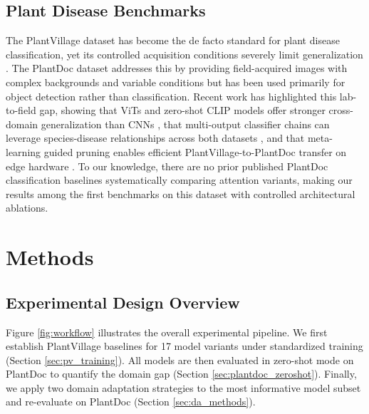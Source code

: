 \documentclass[preprint,12pt]{elsarticle}
\begin{document}
\subsection{Plant Disease Benchmarks}

The PlantVillage dataset has become the de facto standard for plant disease classification, yet its controlled acquisition conditions severely limit generalization \cite{Pandian2022}. The PlantDoc dataset \cite{Singh2020} addresses this by providing field-acquired images with complex backgrounds and variable conditions but has been used primarily for object detection rather than classification. Recent work has highlighted this lab-to-field gap, showing that ViTs and zero-shot CLIP models offer stronger cross-domain generalization than CNNs \cite{Benabbas2025}, that multi-output classifier chains can leverage species-disease relationships across both datasets \cite{Yao2025}, and that meta-learning guided pruning enables efficient PlantVillage-to-PlantDoc transfer on edge hardware \cite{Uddin2026}. To our knowledge, there are no prior published PlantDoc classification baselines systematically comparing attention variants, making our results among the first benchmarks on this dataset with controlled architectural ablations.

\section{Methods}
\label{sec:methods}

\subsection{Experimental Design Overview}

Figure \ref{fig:workflow} illustrates the overall experimental pipeline. We first establish PlantVillage baselines for 17 model variants under standardized training (Section \ref{sec:pv_training}). All models are then evaluated in zero-shot mode on PlantDoc to quantify the domain gap (Section \ref{sec:plantdoc_zeroshot}). Finally, we apply two domain adaptation strategies to the most informative model subset and re-evaluate on PlantDoc (Section \ref{sec:da_methods}).
\end{document}
